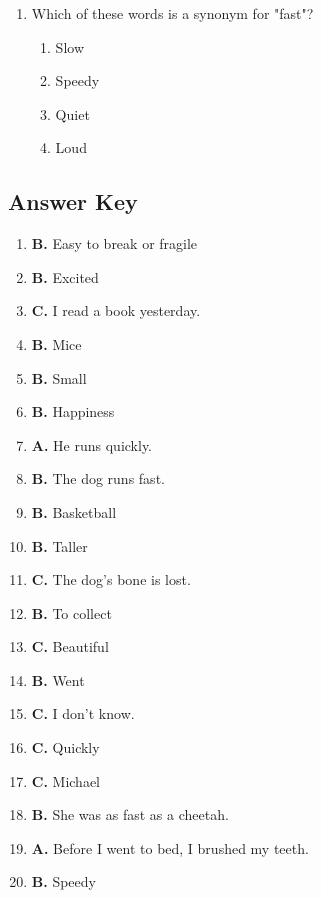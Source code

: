\documentclass[12pt]{article}
\begin{document}
\begin{enumerate}
    \vspace{0.5cm}

    \item Which of these words is a synonym for "fast"?

    \begin{enumerate}[label=\Alph*.]
        \item Slow
        \item Speedy
        \item Quiet
        \item Loud
    \end{enumerate}

\end{enumerate}

\newpage

\subsection*{Answer Key}

\begin{enumerate}
    \item \textbf{B.} Easy to break or fragile
    \item \textbf{B.} Excited
    \item \textbf{C.} I read a book yesterday.
    \item \textbf{B.} Mice
    \item \textbf{B.} Small
    \item \textbf{B.} Happiness
    \item \textbf{A.} He runs quickly.
    \item \textbf{B.} The dog runs fast.
    \item \textbf{B.} Basketball
    \item \textbf{B.} Taller
    \item \textbf{C.} The dog's bone is lost.
    \item \textbf{B.} To collect
    \item \textbf{C.} Beautiful
    \item \textbf{B.} Went
    \item \textbf{C.} I don't know.
    \item \textbf{C.} Quickly
    \item \textbf{C.} Michael
    \item \textbf{B.} She was as fast as a cheetah.
    \item \textbf{A.} Before I went to bed, I brushed my teeth.
    \item \textbf{B.} Speedy
\end{enumerate}
\end{document}
